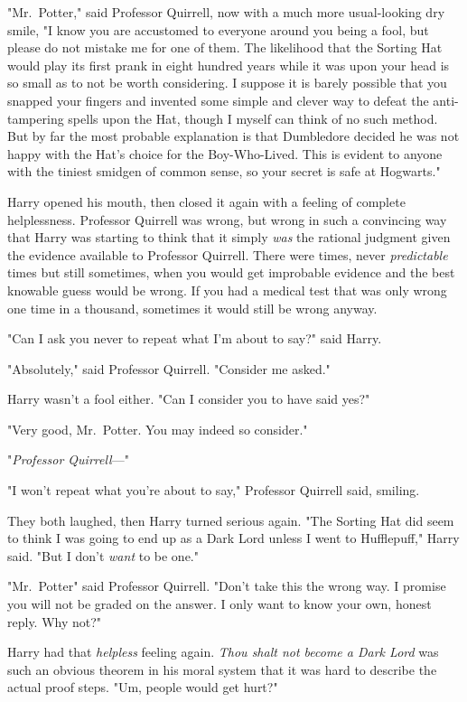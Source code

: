 "Mr.~Potter," said Professor Quirrell, now with a much more usual-looking dry
smile, "I know you are accustomed to everyone around you being a fool, but
please do not mistake me for one of them. The likelihood that the Sorting Hat
would play its first prank in eight hundred years while it was upon your head
is so small as to not be worth considering. I suppose it is barely possible
that you snapped your fingers and invented some simple and clever way to defeat
the anti-tampering spells upon the Hat, though I myself can think of no such
method. But by far the most probable explanation is that Dumbledore decided he
was not happy with the Hat's choice for the Boy-Who-Lived. This is evident to
anyone with the tiniest smidgen of common sense, so your secret is safe at
Hogwarts."

Harry opened his mouth, then closed it again with a feeling of complete
helplessness. Professor Quirrell was wrong, but wrong in such a convincing way
that Harry was starting to think that it simply \emph{was} the rational
judgment given the evidence available to Professor Quirrell. There were times,
never \emph{predictable} times but still sometimes, when you would get
improbable evidence and the best knowable guess would be wrong. If you had a
medical test that was only wrong one time in a thousand, sometimes it would
still be wrong anyway.

"Can I ask you never to repeat what I'm about to say?" said Harry.

"Absolutely," said Professor Quirrell. "Consider me asked."

Harry wasn't a fool either. "Can I consider you to have said yes?"

"Very good, Mr.~Potter. You may indeed so consider."

"\emph{Professor Quirrell}\mbox{---}"

"I won't repeat what you're about to say," Professor Quirrell said, smiling.

They both laughed, then Harry turned serious again. "The Sorting Hat did seem
to think I was going to end up as a Dark Lord unless I went to Hufflepuff,"
Harry said. "But I don't \emph{want} to be one."

"Mr.~Potter{\el}" said Professor Quirrell. "Don't take this the wrong way. I
promise you will not be graded on the answer. I only want to know your own,
honest reply. Why not?"

Harry had that \emph{helpless} feeling again. \emph{Thou shalt not become a
Dark Lord} was such an obvious theorem in his moral system that it was hard to
describe the actual proof steps. "Um, people would get hurt?"


